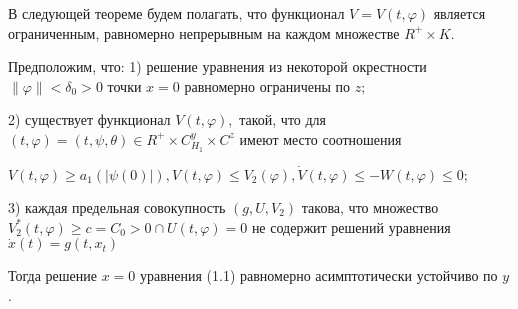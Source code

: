 		В следующей теореме будем полагать, что функционал $V = V(t, \varphi)$ является ограниченным, равномерно непрерывным на каждом множестве $R^+ \times K.$ 
		
		\begin{theorem}\label{t-1.12} Предположим, что: 
			1) решение уравнения из некоторой окрестности ${\| \varphi \| < \delta_0 > 0}$ точки $x = 0$ равномерно ограничены по $z;$
			
			2) существует функционал $V(t, \varphi), $ такой, что для $(t, \varphi) = (t, \psi, \theta) \in R^+ \times C^y_{H_1} \times C^z$ имеют место соотношения
			
			$V(t, \varphi) \ge a_1(| \psi(0) |), V(t, \varphi) \le V_2(\varphi), \dot V(t, \varphi) \le - W(t, \varphi) \le 0;$
			
			3) каждая предельная совокупность $(g, U, V_2)$ такова, что множество ${V_2^{*}(t, \varphi) \ge c = C_0 > 0 } \cap {U(t, \varphi) = 0}$ не содержит решений уравнения $\dot x(t) = g(t, x_t)$
			
			Тогда решение $x = 0$ уравнения (1.1) равномерно асимптотически устойчиво по $y$.			
			
		\end{theorem}

